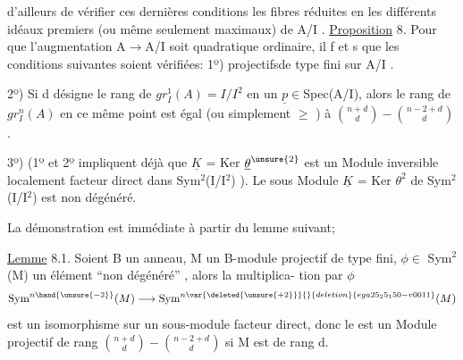 d'ailleurs de vérifier ces dernières conditions  les fibres réduites
en les différents idéaux premiers (ou même seulement maximaux) de A/I .
\uline{Proposition} 8. Pour que l'augmentation A$\rightarrow$A/I soit  quadratique
ordinaire, il f et s que les conditions suivantes soient vérifiées:
1º)    projectifsde type fini sur A/I .

2º) Si d désigne le rang de $gr^{1}_{I}(A) = I/I^{2}$ en un $\underline{p} \in$Spec(A/I),
alors le rang de $gr^{n}_{I}(A)$ en ce même point est égal (ou simplement
$\geqslant$ ) à $\binom{n+d}{d} - \binom{n-2+d}{d}$ .

3º) (1º et 2º impliquent déjà que $\underline{K}$ = Ker $\underline{\theta}^{\unsure{2}}$ est un Module
inversible localement facteur direct dans  Sym$^{2}$(I/I$^{2}$) ). Le sous
Module $\underline{K}$ = Ker $\theta^{2}$ de Sym$^{2}$(I/I$^{2}$) est non dégénéré.

La démonstration est immédiate à partir du lemme suivant; 

 \uline{Lemme} 8.1. Soient B un anneau, M un B-module projectif de
type fini, $\phi \in$ Sym$^{2}$(M) un élément ``non dégénéré'' , alors la multiplica-%
tion par $\phi$
\[ \mathrm{Sym}^{n\hand{\unsure{-2}}}(M) \longrightarrow \mathrm{Sym}^{n\var{\deleted{\unsure{+2}}}{}{deletion}{ega25_25_150-v0011}}(M) \]
est un isomorphisme sur un sous-module facteur direct, donc le 
est un Module projectif de rang $\binom{n+d}{d} - \binom{n-2+d}{d}$ si M est de rang d.

